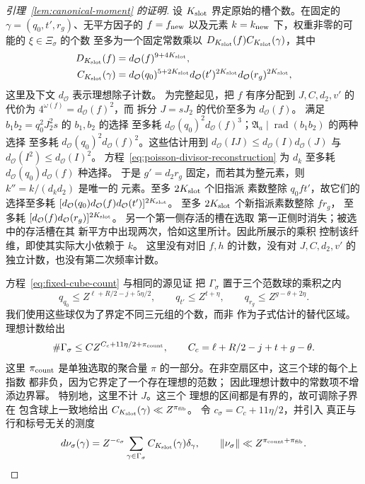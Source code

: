 \documentclass[11pt,a4paper]{article}
\numberwithin{equation}{section}
\numberwithin{figure}{section}
\theoremstyle{definition}
\theoremstyle{remark}
\begin{document}
\begin{proof}[引理~\ref{lem:canonical-moment} 的证明]
设 \(K_{\rm slot}\) 界定原始的槽个数。在固定的
\(\gamma=(q_0,t',r_g)\)、无平方因子的 \(f=f_{\rm new}\) 以及元素
\(k=k_{\rm new}\) 下，权重非零的可能的 \(\xi\in\Xi_\sigma\) 的个数
至多为一个固定常数乘以
\(D_{K_{\rm slot}}(f)C_{K_{\rm slot}}(\gamma)\)，其中
\begin{equation}\label{eq:inverse-new-fibre}
 \begin{split}
 D_{K_{\rm slot}}(f)&=d_{\mathcal O}(f)^{9+4K_{\rm slot}},\\
 C_{K_{\rm slot}}(\gamma)&=
 d_{\mathcal O}(q_0)^{5+2K_{\rm slot}}
 d_{\mathcal O}(t')^{2K_{\rm slot}}
 d_{\mathcal O}(r_g)^{2K_{\rm slot}},
 \end{split}
\end{equation}
这里及下文 \(d_{\mathcal O}\) 表示理想除子计数。
为完整起见，把 \(f\) 有序分配到
\(J,C,d_2,v'\) 的代价为 \(4^{\omega(f)}=d_{\mathcal O}(f)^2\)，而
拆分 \(J=sJ_2\) 的代价至多为 \(d_{\mathcal O}(f)\)。
满足 \(b_1b_2=q_0^2J_2^2s\) 的 \(b_1,b_2\) 的选择
至多耗
\(d_{\mathcal O}(q_0)^2d_{\mathcal O}(f)^3\)；\(\mathfrak A_a\mid\operatorname{rad}(b_1b_2)\) 的两种选择
至多耗
\(d_{\mathcal O}(q_0)^2d_{\mathcal O}(f)^2\)。这些估计用到
\(d_{\mathcal O}(IJ)\le d_{\mathcal O}(I)d_{\mathcal O}(J)\) 与
\(d_{\mathcal O}(I^2)\le d_{\mathcal O}(I)^2\)。
方程~\eqref{eq:poisson-divisor-reconstruction} 为 \(d_k\) 至多耗
\(d_{\mathcal O}(q_0)d_{\mathcal O}(f)\) 种选择。
于是 \(g'=d_2r_g\) 固定，而若其为整元素，则 \(k''=k/(d_kd_2)\) 是唯一的
元素。至多 \(2K_{\rm slot}\) 个旧指派
素数整除 \(q_0ft'\)，故它们的选择至多耗
\([d_{\mathcal O}(q_0)d_{\mathcal O}(f)d_{\mathcal O}(t')]^{2K_{\rm slot}}\)。
至多 \(2K_{\rm slot}\) 个新指派素数整除 \(fr_g\)，
至多耗
\([d_{\mathcal O}(f)d_{\mathcal O}(r_g)]^{2K_{\rm slot}}\)。
另一个第一侧存活的槽在选取
第一正侧时消失；被选中的存活槽在其
新平方中出现两次，恰如这里所计。因此所展示的乘积
控制该纤维，即使其实际大小依赖于 \(k\)。
这里没有对旧 \(f,h\) 的计数，没有对
\(J,C,d_2,v'\) 的独立计数，也没有第二次频率计数。

方程~\eqref{eq:fixed-cube-count} 与相同的源见证
把 \(\Gamma_\sigma\) 置于三个范数球的乘积之内
\[
 q_{q_0}\le Z^{\ell+R/2-j+5\eta/2},\qquad
 q_{t'}\le Z^{t+\eta},\qquad q_{r_g}\le Z^{g-\theta+2\eta}.
\]
我们使用这些球仅为了界定不同三元组的个数，而非
作为子式估计的替代区域。理想计数给出
\begin{equation}\label{eq:canonical-fixed-count}
 \#\Gamma_\sigma\le C Z^{C_c+11\eta/2+\pi_{\rm count}},\qquad
 C_c=\ell+R/2-j+t+g-\theta.
\end{equation}
这里 \(\pi_{\rm count}\) 是单独选取的聚合量
\(\pi\) 的一部分。在非空扇区中，这三个球的每个上指数
都非负，因为它界定了一个存在理想的范数；
因此理想计数中的常数项不增添边界幂。
特别地，这里不计 \(J\)。这三个
理想的区间都是有界的，故可调除子界在
包含球上一致地给出
\(C_{K_{\rm slot}}(\gamma)\ll Z^{\pi_{\rm fib}}\)。
令 \(c_\sigma=C_c+11\eta/2\)，并引入
真正与行和标号无关的测度
\begin{equation}\label{eq:inverse-normalized-triples}
 d\nu_\sigma(\gamma)=Z^{-c_\sigma}
 \sum_{\gamma\in\Gamma_\sigma}C_{K_{\rm slot}}(\gamma)\delta_\gamma,
 \qquad \|\nu_\sigma\|\ll Z^{\pi_{\rm count}+\pi_{\rm fib}}.
\end{equation}


\end{proof}
\end{document}
